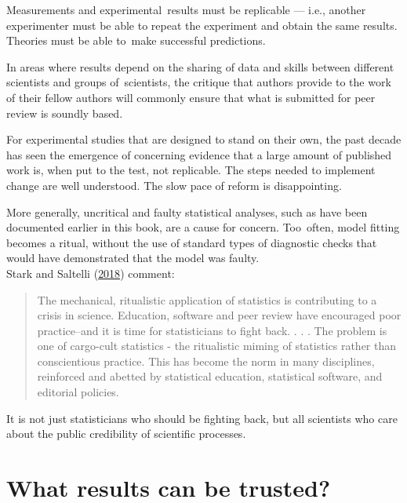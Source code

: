 \documentclass[
  10pt,
  b5paper]{book}
\begin{document}
Measurements and experimental~results must be replicable
--- i.e., another experimenter must be able to repeat the
experiment and obtain the same results. Theories must
be able to~make successful predictions.

In areas where results depend on the sharing of data and
skills between different scientists and groups of~scientists,
the critique that authors provide to the work of their fellow
authors will commonly ensure that what is submitted for peer
review is soundly based.

For experimental studies that are designed to stand on
their own, the past decade has seen the emergence of
concerning evidence that a large amount of published
work is, when put to the test, not replicable. The
steps needed to implement change are well understood.
The slow pace of reform is disappointing.

More generally, uncritical and faulty statistical analyses,
such as have been documented earlier in this book, are a
cause for concern. Too~often, model fitting becomes a ritual,
without the use of standard types of diagnostic checks that
would have demonstrated that the model was faulty.\\
Stark and Saltelli (\protect\hyperlink{ref-stark2018cargo}{2018}) comment:

\begin{quote}
The mechanical, ritualistic application of statistics is contributing to a crisis in science. Education, software and peer review have encouraged poor practice--and it is time for statisticians to fight back.
. . .
The problem is one of cargo-cult statistics - the ritualistic miming of
statistics rather than conscientious practice. This has become the norm
in many disciplines, reinforced and abetted by statistical education,
statistical software, and editorial policies.
\end{quote}

It is not just statisticians who should be fighting back, but all
scientists who care about the public credibility of scientific
processes.

\hypertarget{what-results-can-be-trusted}{%
\section{What results can be trusted?}\label{what-results-can-be-trusted}}
\end{document}
